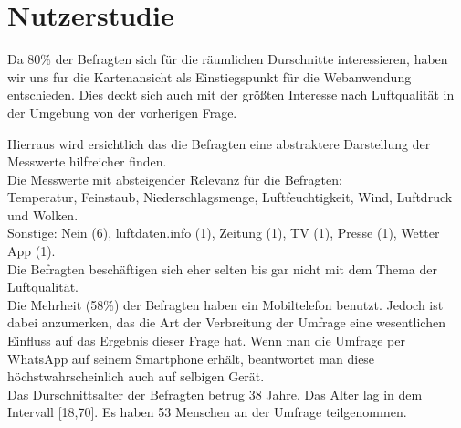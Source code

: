 \section{Nutzerstudie}

\noindent{}
Da 80\% der Befragten sich für die räumlichen Durschnitte interessieren, 
haben wir uns fur die Kartenansicht als Einstiegspunkt für die \gls{Webanwendung} entschieden. 
Dies deckt sich auch mit der größten Interesse nach Luftqualität in der Umgebung von der vorherigen Frage.
\\
\noindent{} 

\noindent{}
Hierraus wird ersichtlich das die Befragten eine abstraktere Darstellung der Messwerte hilfreicher finden.
\\
\noindent{}
Die Messwerte mit absteigender Relevanz für die Befragten: 
\\Temperatur, Feinstaub, Niederschlagsmenge, Luftfeuchtigkeit, Wind, Luftdruck und Wolken.
\\ 
\noindent{}
Sonstige: Nein (6), luftdaten.info (1), Zeitung (1), TV (1), Presse (1), Wetter App (1).
\\
\noindent{}
Die Befragten beschäftigen sich eher selten bis gar nicht mit dem Thema der Luftqualität.
\\
\noindent{}
Die Mehrheit (58\%) der Befragten haben ein Mobiltelefon benutzt. 
Jedoch ist dabei anzumerken, das die Art der Verbreitung der Umfrage eine wesentlichen Einfluss auf das Ergebnis dieser Frage hat. 
Wenn man die Umfrage per WhatsApp auf seinem Smartphone erhält, beantwortet man diese höchstwahrscheinlich auch auf selbigen Gerät.
\\
\noindent{}
Das Durschnittsalter der Befragten betrug 38 Jahre. Das Alter lag in dem Intervall [18,70]. 
Es haben 53 Menschen an der Umfrage teilgenommen. 